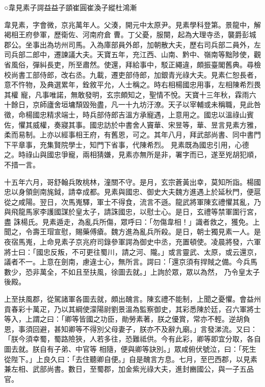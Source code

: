 
\begin{pinyinscope}

 ○韋見素子諤益益子顗崔圓崔渙子縱杜鴻漸



 韋見素，字會微，京兆萬年人。父湊，開元中太原尹。見素學科登第。景龍中，解褐相王府參軍，歷衛佐、河南府倉
 曹。丁父憂，服闋，起為大理寺丞，襲爵彭城郡公。坐事出為坊州司馬。入為庫部員外郎，加朝散大夫，歷右司兵部二員外，左司兵部二郎中，遷諫議大夫。天寶五年，充江西、山南、黔中、嶺南等黜陟使，觀省風俗，彈糾長吏，所至肅然。使還，拜給事中，駁正繩違，頗振臺閣舊典。尋檢校尚書工部侍郎，改右丞。九載，遷吏部侍郎，加銀青光祿大夫。見素仁恕長者，意不忤物，及典選累年，銓敘平允，人士稱之。時右相楊國忠用事，左相陳希烈畏其權
 寵，凡事唯諾，無敢發明，玄宗頗知之，聖情不悅。天寶十三年秋，霖雨六十餘日，京師廬舍垣墉頹毀殆盡，凡一十九坊汙潦。天子以宰輔或未稱職，見此咎徵，命楊國忠精求端士，時兵部侍郎吉溫方承寵遇，上意用之。國忠以溫祿山賓佐，懼其威權，奏寢其事。國忠訪於中書舍人竇華、宋昱等，華、昱言見素方雅，柔而易制。上亦以經事相王府，有舊恩，可之。其年八月，拜武部尚書、同中書門下平章事，充集賢院學士，知門下省事，代陳希烈。
 見素既為國忠引用，心德之。時祿山與國忠爭寵，兩相猜嫌，見素亦無所是非，署字而已，遂至兇胡犯順，不措一言。



 十五年六月，哥舒翰兵敗桃林，潼關不守。是月，玄宗蒼黃出幸，莫知所詣。楊國忠以身領劍南旄鉞，請幸成都。見素與國忠、御史大夫魏方進遇上於延秋門，便扈從之咸陽。翌日，次馬嵬驛，軍士不得食，流言不遜。龍武將軍陳玄禮懼其亂，乃與飛龍馬家李護國謀於皇太子，請誅國忠，以慰士心。是日，玄禮等禁軍圍行宮，盡
 誅楊氏。見素遁走，為亂兵所傷，眾呼曰：「勿傷韋相！」識者救之，獲免。上聞之，令壽王瑁宣慰，賜藥傅瘡。魏方進為亂兵所殺。是日，朝士獨見素一人。是夜宿馬嵬，上命見素子京兆府司錄參軍諤為御史中丞，充置頓使。凌晨將發，六軍將士曰：「國忠反叛，不可更往蜀川，請之河、隴。」或言靈武、太原，或云還京，議者不一。上意在劍南，慮違士心，無所言。諤曰：「還京須有捍賊之備。今兵馬數少，恐非萬全，不如且至扶風，徐圖去就。」上詢於眾，眾以為然，
 乃令皇太子後殿。



 上至扶風郡，從駕諸軍各圖去就，頗出醜言。陳玄禮不能制，上聞之憂懼。會益州貢春彩十萬疋，乃以其綱使濛陽尉劉景溫為監察御史，其彩悉陳於廷，召六軍將士等入，上謂之曰：「卿等皆國之功臣，勛勞素著，朕之優賞，常亦不輕。逆胡負恩，事須回避，甚知卿等不得別父母妻子，朕亦不及辭九廟。」言發涕流。又曰：「朕今須幸蜀，蜀路險狹，人若多往，恐難祗供。今有此彩，卿等即宜分取，各自圖去就。朕自有子弟、中官等
 相隨，便與卿等訣別。」眾咸俯伏號泣，曰：「死生從陛下。」上良久曰：「去住聽卿自便。」自是醜言方息。七月，至巴西郡，以見素兼左相、武部尚書。數日，至蜀郡，加金紫光祿大夫，進封豳國公，與一子五品官。




\end{pinyinscope}
